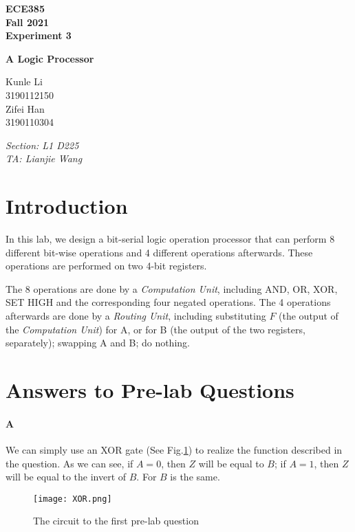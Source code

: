 \documentclass[12pt]{article}
\begin{document}
\begin{titlepage}
    \centering
    {\Huge\bfseries ECE385\\\Large Fall 2021\\\Large Experiment 3}

    \vspace{1cm}
    
    {\LARGE\bfseries A Logic Processor}
    
    \vspace{2cm}
    
    {\Large Kunle Li\\3190112150\\Zifei Han\\3190110304}
    
    \vfill
    
    {\large\itshape Section: L1 D225\\TA: Lianjie Wang}
    \end{titlepage}

\section{Introduction}
In this lab, we design a bit-serial logic operation processor that can perform 8 different bit-wise operations and 4 different operations afterwards. These operations are performed on two 4-bit registers. 

The 8 operations are done by a \textit{Computation Unit}, including AND, OR, XOR, SET HIGH and the corresponding four negated operations. The 4 operations afterwards are done by a \textit{Routing Unit}, including substituting $F$ (the output of the \textit{Computation Unit}) for A, or for B (the output of the two registers, separately); swapping A and B; do nothing.

\section{Answers to Pre-lab Questions}
\paragraph{A}
We can simply use an XOR gate (See Fig.\ref{xor}) to realize the function described in the question. As we can see, if $A=0$, then $Z$ will be equal to $B$; if $A=1$, then $Z$ will be equal to the invert of $B$. For $B$ is the same.
\begin{figure}[h]
    \centering
    \texttt{[image: XOR.png]}
    \caption{The circuit to the first pre-lab question}
    \label{xor}
\end{figure}
\end{document}
